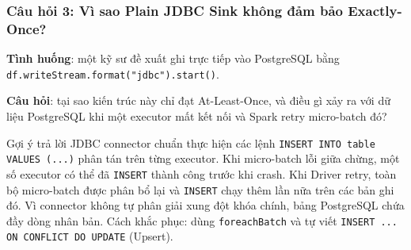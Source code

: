 \documentclass[12pt]{article}
\begin{document}
\subsubsection{Câu hỏi 3: Vì sao Plain JDBC Sink không đảm bảo Exactly-Once?}

\textbf{Tình huống}: một kỹ sư đề xuất ghi trực tiếp vào PostgreSQL bằng \texttt{df.writeStream.format("jdbc").start()}.

\textbf{Câu hỏi}: tại sao kiến trúc này chỉ đạt At-Least-Once, và điều gì xảy ra với dữ liệu PostgreSQL khi một executor mất kết nối và Spark retry micro-batch đó?

\begin{examplebox}{Gợi ý trả lời}
JDBC connector chuẩn thực hiện các lệnh \texttt{INSERT INTO table VALUES (...)} phân tán trên từng executor. Khi micro-batch lỗi giữa chừng, một số executor có thể đã \texttt{INSERT} thành công trước khi crash. Khi Driver retry, toàn bộ micro-batch được phân bổ lại và \texttt{INSERT} chạy thêm lần nữa trên các bản ghi đó. Vì connector không tự phân giải xung đột khóa chính, bảng PostgreSQL chứa đầy dòng nhân bản. Cách khắc phục: dùng \texttt{foreachBatch} và tự viết \texttt{INSERT ... ON CONFLICT DO UPDATE} (Upsert).
\end{examplebox}
\end{document}
